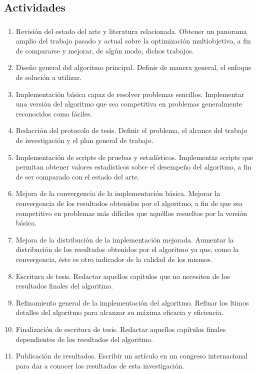 \documentclass[serif]{beamer}
\begin{document}
\subsection{Actividades}
\begin{frame}[allowframebreaks]
\frametitle{\insertsubsection}
	\begin{enumerate}
		\item Revisión del estado del arte y literatura relacionada. Obtener un panorama amplio del trabajo pasado y actual sobre la optimización multiobjetivo, a fin de compararse y mejorar, de algún modo, dichos trabajos.
		\item Diseño general del algoritmo principal. Definir de manera general, el enfoque de solución a utilizar.
		\item Implementación básica capaz de resolver problemas sencillos. Implementar una versión del algoritmo que sea competitiva en problemas generalmente reconocidos como fáciles.
		\item Redacción del protocolo de tesis. Definir el problema, el alcance del trabajo de investigación y el plan general de trabajo.
		\item Implementación de scripts de pruebas y estadísticos. Implementar scripts que permitan obtener valores estadísticos sobre el desempeño del algoritmo, a fin de ser comparado con el estado del arte.
		\item Mejora de la convergencia de la implementación básica. Mejorar la convergencia de los resultados obtenidos por el algoritmo, a fin de que sea competitivo en problemas más difíciles que aquéllos resueltos por la versión básica.
		\item Mejora de la distribución de la implementación mejorada. Aumentar la distribución de los resultados obtenidos por el algoritmo ya que, como la convergencia, éste es otro indicador de la calidad de los mismos.
		\item Escritura de tesis. Redactar aquellos capítulos que no necesiten de los resultados finales del algoritmo.
		\item Refinamiento general de la implementación del algoritmo. Refinar los ltimos detalles del algoritmo para alcanzar su máxima eficacia y eficiencia.
		\item Finalización de escritura de tesis. Redactar aquellos capítulos finales dependientes de los resultados del algoritmo.
		\item Publicación de resultados. Escribir un artículo en un congreso internacional para dar a conocer los resultados de esta investigación.
	\end{enumerate}
\end{frame}
\end{document}
